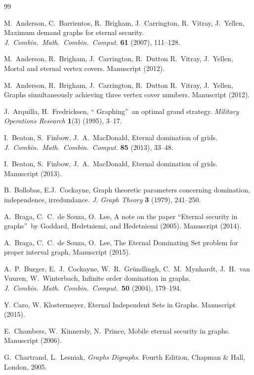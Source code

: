 \documentclass[12pt]{article}%
\begin{document}
\begin{thebibliography}{99}                                                                                               %


M.~Anderson, C.~Barrientos, R.~Brigham, J.~Carrington,
R.~Vitray, J.~Yellen, Maximum demand graphs for eternal security.
\emph{J}.~\emph{Combin.~Math.~Combin.~Comput.} \textbf{61} (2007), 111--128.

M.~Anderson, R.~Brigham, J.~Carrington, R.~Dutton R.~Vitray,
J.~Yellen, Mortal and eternal vertex covers. Manuscript (2012).

M.~Anderson, R.~Brigham, J.~Carrington, R.~Dutton R.~Vitray,
J.~Yellen, Graphs simultaneously achieving three vertex cover numbers.
Manuscript (2012).

J.~Arquilla, H.~Fredricksen, \textquotedblleft
Graphing\textquotedblright\ an optimal grand strategy. \emph{Military
Operations Research} \textbf{1}(3) (1995), 3--17.

I.~Beaton, S.~Finbow, J.~A.~MacDonald, Eternal domination of
grids. \emph{J}.~\emph{Combin.~Math.~Combin.~Comput.} \textbf{85} (2013), 33--48.

I.~Beaton, S.~Finbow, J.~A.~MacDonald, Eternal domination of
grids. Manuscript (2013).

B.~Bollobas, E.J.~Cockayne, Graph theoretic parameters concerning
domination, independence, irredundance. \emph{J. Graph Theory} \textbf{3}
(1979), 241--250.

A.~Braga, C.~C.~de Souza, O.~Lee, A note on the paper
\textquotedblleft Eternal security in graphs\textquotedblright\ by Goddard,
Hedetniemi, and Hedetniemi (2005). Manuscript (2014).

A.~Braga, C.~C.~de Souza, O.~Lee, The Eternal Dominating Set
problem for proper interval graph, Manuscript (2015).

A.~P.~Burger, E.~J.~Cockayne, W.~R.~Gr\"{u}ndlingh,
C.~M.~Mynhardt, J.~H.~van Vuuren, W.~Winterbach, Infinite order domination in
graphs. \emph{J}.~\emph{Combin.~Math.~Combin.~Comput.}~\textbf{50} (2004), 179--194.

Y. Caro, W. Klostermeyer, Eternal Independent Sets in Graphs.
Manuscript (2015).

E.~Chambers, W.~Kinnersly, N.~Prince, Mobile eternal
security in graphs. Manuscript (2006).

G.~Chartrand, L.~Lesniak, \emph{Graphs Digraphs}. Fourth Edition,
Chapman \& Hall, London, 2005.


\end{thebibliography}
\end{document}
